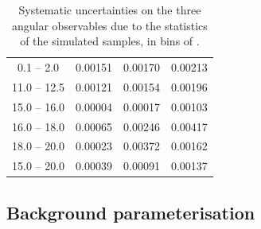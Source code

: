 \begin{table}[h]
\centering
\caption{Systematic uncertainties on the three angular observables due to the statistics 
of the simulated samples, in bins of \qsq.}
\begin{tabular}{c|ccc}
\boldmath{ \qsq [\gevgevcccc] } &  \boldmath{ $\afbl$}   &  \boldmath{ \fl } &  \boldmath{ $\afbh$ } \\ \hline
\phantom{x}0.1 -- 2.0\phantom{x}     &  0.00151 & 0.00170  & 0.00213 \\
11.0 -- 12.5  &  0.00121 & 0.00154  & 0.00196 \\
15.0 -- 16.0  &  0.00004 & 0.00017  & 0.00103 \\
16.0 -- 18.0  &  0.00065 & 0.00246  & 0.00417 \\
18.0 -- 20.0  &  0.00023 & 0.00372  & 0.00162 \\
\hline
15.0 -- 20.0  &  0.00039 & 0.00091  & 0.00137 \\
\end{tabular}
\label{tab:stateffsys}
\end{table}


\subsection{Background parameterisation}
\label{sec:bkgShapeSys}

